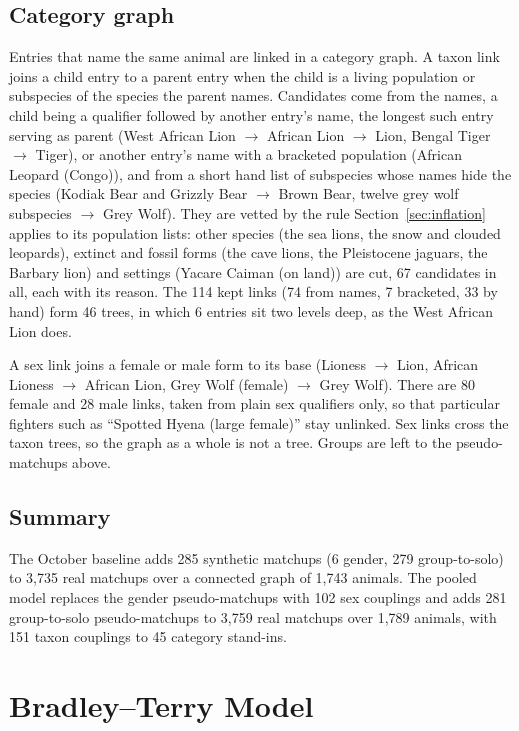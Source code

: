 \documentclass[11pt]{article}
\begin{document}
\subsection{Category graph}
\label{sec:catgraph}
Entries that name the same animal are linked in a category graph. A taxon link joins a child entry to a parent entry when the child is a living population or subspecies of the species the parent names. Candidates come from the names, a child being a qualifier followed by another entry's name, the longest such entry serving as parent (West African Lion $\to$ African Lion $\to$ Lion, Bengal Tiger $\to$ Tiger), or another entry's name with a bracketed population (African Leopard (Congo)), and from a short hand list of subspecies whose names hide the species (Kodiak Bear and Grizzly Bear $\to$ Brown Bear, twelve grey wolf subspecies $\to$ Grey Wolf). They are vetted by the rule Section~\ref{sec:inflation} applies to its population lists: other species (the sea lions, the snow and clouded leopards), extinct and fossil forms (the cave lions, the Pleistocene jaguars, the Barbary lion) and settings (Yacare Caiman (on land)) are cut, 67 candidates in all, each with its reason. The 114 kept links (74 from names, 7 bracketed, 33 by hand) form 46 trees, in which 6 entries sit two levels deep, as the West African Lion does.

A sex link joins a female or male form to its base (Lioness $\to$ Lion, African Lioness $\to$ African Lion, Grey Wolf (female) $\to$ Grey Wolf). There are 80 female and 28 male links, taken from plain sex qualifiers only, so that particular fighters such as ``Spotted Hyena (large female)'' stay unlinked. Sex links cross the taxon trees, so the graph as a whole is not a tree. Groups are left to the pseudo-matchups above.

\subsection{Summary}
The October baseline adds 285 synthetic matchups (6 gender, 279 group-to-solo) to 3,735 real matchups over a connected graph of 1,743 animals. The pooled model replaces the gender pseudo-matchups with 102 sex couplings and adds 281 group-to-solo pseudo-matchups to 3,759 real matchups over 1,789 animals, with 151 taxon couplings to 45 category stand-ins.

\section{Bradley--Terry Model}
\label{sec:bt}
\end{document}
